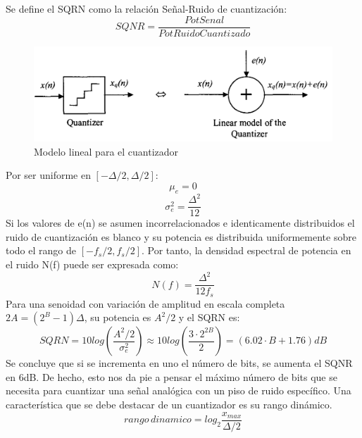 \documentclass[assd_tp3_main.tex]{subfiles}
\begin{document}
Se define el SQRN como la relación Señal-Ruido de cuantización:
\[ SQNR= \frac{PotSenal}{PotRuidoCuantizado}\]

\begin{figure}[H]
\centering
\includegraphics[width=0.52\linewidth]{images/ej4/cuantmodel.png}
\caption{Modelo lineal para el cuantizador}
\label{fig:cuantmodel}
\end{figure}


Por ser uniforme en $[-\Delta/2,\Delta/2]$:\\
\[ \mu_e = 0 \]
\[ \sigma_e^2 = \frac{\Delta^2}{12} \]
Si los valores de e(n) se asumen incorrelacionados e identicamente distribuidos el ruido de cuantización es blanco y su potencia es distribuida uniformemente sobre todo el rango de $[-f_s/2,f_s/2]$. Por tanto, la densidad espectral de potencia en el ruido N(f) puede ser expresada como:
\[ N(f)=\frac{\Delta^2}{12f_s} \]
Para una senoidad con variación de amplitud en escala completa\\ 
$2A =(2^B-1)\Delta$, su potencia es $A^2/2$ y el SQRN es:\\
\[ SQRN=10log\left( \frac{A^2/2}{\sigma_e^2} \right)\approx10log\left(\frac{3\cdot2^{2B}}{2}\right)=(6.02 \cdot B+1.76)dB \]
Se concluye que si se incrementa en uno el número de bits, se aumenta el SQNR en 6dB.
De hecho, esto nos da pie a pensar el máximo número de bits que se necesita para cuantizar una señal analógica con un piso de ruido específico.
Una característica que se debe destacar de un cuantizador es su rango dinámico. 
\[ rango\,dinamico=log_2\frac{x_{max}}{\Delta/2}\]

\end{document}
